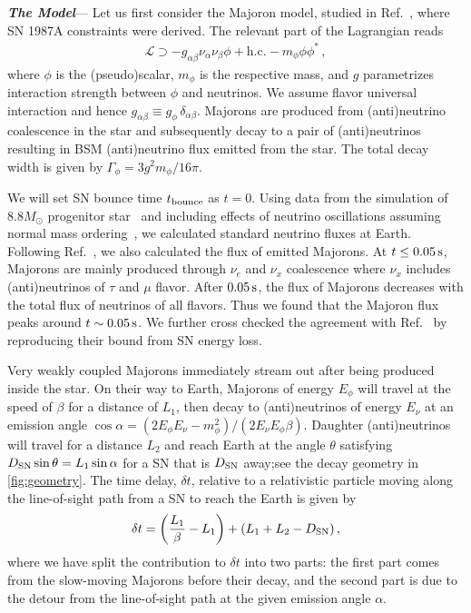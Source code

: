 \documentclass[aps,twocolumn,prl,showpacs,showkeys,preprintnumbers,superscriptaddress,nobibnotes,floatfix,longbibliography,notitlepage,nofootinbib]{revtex4-2}
\begin{document}
\textbf{\textit{The Model}}---
Let us first consider the Majoron model, studied in Ref.~\cite{Fiorillo:2022cdq}, where SN 1987A constraints were derived.
The relevant part of the Lagrangian reads
\begin{align}
\mathcal{L} \supset -g_{\alpha\beta} \nu_\alpha \nu_\beta \phi + \text{h.c.} - m_\phi \phi\phi^*\,,
\end{align}
where $\phi$ is the (pseudo)scalar, $m_\phi$ is the respective mass, and $g$ parametrizes interaction strength between $\phi$ and neutrinos. We assume flavor universal interaction and hence $g_{\alpha\beta}\equiv g_\phi \, \delta_{\alpha\beta}$. 
Majorons are produced from (anti)neutrino coalescence in the star and subsequently decay to a pair of (anti)neutrinos resulting in BSM (anti)neutrino flux emitted from the star.
The total decay width is given by $\Gamma_\phi = 3g^2 m_\phi/16 \pi$.

We will set SN bounce time $t_{\rm bounce}$ as $t = 0$.
Using data from the simulation of $8.8 M_\odot$ progenitor star~\cite{Huedepohl2010} and including effects of neutrino oscillations assuming normal mass ordering~\cite{Dighe:1999bi}, we calculated standard neutrino fluxes at Earth. Following Ref.~\cite{Fiorillo:2022cdq}, we also calculated the flux of emitted Majorons.
At $t \leq \unit[0.05]{s}$, Majorons are mainly produced through $\nu_e$ and $\nu_x$ coalescence where $\nu_x$ includes (anti)neutrinos of $\tau$ and $\mu$ flavor. After $\unit[0.05]{s}$, the flux of Majorons decreases with the total flux of neutrinos of all flavors. Thus we found that the Majoron flux peaks around $t \sim \unit[0.05]{s}$. We further cross checked the agreement with Ref.~\cite{Fiorillo:2022cdq} by reproducing their bound from SN energy loss. 


Very weakly coupled Majorons immediately stream out after being produced inside the star.
On their way to Earth, Majorons of energy $E_\phi$ will travel at the speed of $\beta$ for a distance of $L_1$, then decay to (anti)neutrinos of energy $E_\nu$ at an emission angle $\cos\alpha = (2 E_\phi E_{\nu} - m^2_\phi)/(2E_{\nu}E_\phi\beta)$.
Daughter (anti)neutrinos will travel for a distance $L_2$ and reach Earth at the angle $\theta$ satisfying $D_{\rm SN} \sin\theta = L_1 \sin\alpha$ for a SN that is $D_{\rm SN}$ away;see the decay geometry in \cref{fig:geometry}.
The time delay, $\delta t$, relative to a relativistic particle moving along the line-of-sight path from a SN to reach the Earth is given by~\cite{Jaeckel:2017tud}
\begin{align}
    \delta t = \left(\frac{L_1}{\beta}-L_1\right) + (L_1 + L_2 -D_{\rm SN})\,,
    \label{eq:deltatexa}
\end{align}
where we have split the contribution to $\delta t$ into two parts: the first part comes from the slow-moving Majorons before their decay, and the second part is due to the detour from the line-of-sight path at the given emission angle $\alpha$. 
\end{document}
